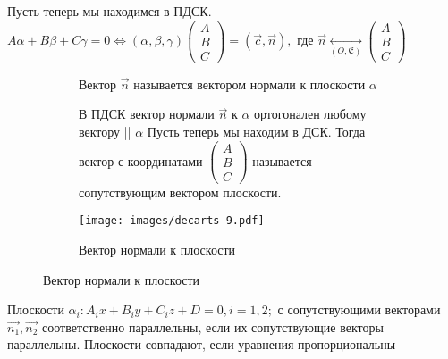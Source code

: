 Пусть теперь мы находимся в ПДСК. \newline
\(A\alpha+B\beta+C\gamma = 0 \Longleftrightarrow (\alpha, \beta, \gamma)\begin{pmatrix}
	A \\ B \\ C
\end{pmatrix} = (\vec c, \vec n), \text{ где } \vec n \underset{(O, \mathfrak{E})}{\longleftrightarrow}\begin{pmatrix}
	A \\ B \\ C
\end{pmatrix}\)

\begin{figure}[h]
	\begin{subfigure}[t!]{0.6\linewidth}
		\begin{definition}
			Вектор $\vec{n}$ называется вектором нормали к плоскости $\alpha$
		\end{definition}
		\begin{proposition}
			В ПДСК вектор нормали $\vec{n}$ к $\alpha$ ортогонален любому вектору || $\alpha$ \newline
			Пусть теперь мы находим в ДСК. Тогда вектор с координатами $\begin{pmatrix}
				A \\ B\\ C
			\end{pmatrix}$ называется сопутствующим вектором плоскости.
		\end{proposition}
	\end{subfigure}
	\begin{subfigure}[b!]{0.4\linewidth}
		\centering
		\texttt{[image: images/decarts-9.pdf]}
		\caption*{Вектор нормали к плоскости}
		\label{Decart9}
	\end{subfigure}
\end{figure}
\begin{proposition}
	Плоскости \(\alpha_i: A_ix+B_iy+C_iz+D = 0, i= 1,2;\) с сопутствующими векторами \(\vec{n_1}, \vec{n_2}\) соответственно параллельны, если их сопутствующие векторы параллельны. Плоскости совпадают, если уравнения пропорциональны
\end{proposition}
